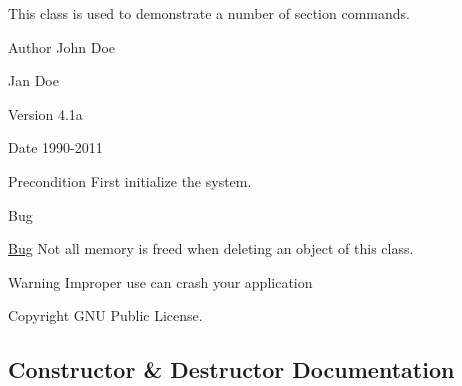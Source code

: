 This class is used to demonstrate a number of section commands. \begin{DoxyAuthor}{Author}
John Doe 

Jan Doe 
\end{DoxyAuthor}
\begin{DoxyVersion}{Version}
4.\+1a 
\end{DoxyVersion}
\begin{DoxyDate}{Date}
1990-\/2011 
\end{DoxyDate}
\begin{DoxyPrecond}{Precondition}
First initialize the system. 
\end{DoxyPrecond}
\begin{DoxyRefDesc}{Bug}
\item[\hyperlink{bug__bug000002}{Bug}]Not all memory is freed when deleting an object of this class. \end{DoxyRefDesc}
\begin{DoxyWarning}{Warning}
Improper use can crash your application 
\end{DoxyWarning}
\begin{DoxyCopyright}{Copyright}
G\+NU Public License. 
\end{DoxyCopyright}


\subsection{Constructor \& Destructor Documentation}
